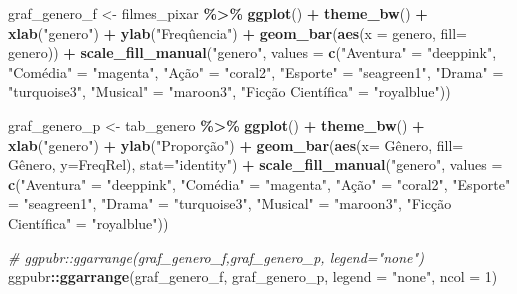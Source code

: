 \documentclass[
]{book}
\newenvironment{Shaded}{\begin{snugshade}}{\end{snugshade}}
\newcommand{\AttributeTok}[1]{\textcolor[rgb]{0.13,0.29,0.53}{#1}}
\newcommand{\CommentTok}[1]{\textcolor[rgb]{0.56,0.35,0.01}{\textit{#1}}}
\newcommand{\DecValTok}[1]{\textcolor[rgb]{0.00,0.00,0.81}{#1}}
\newcommand{\FunctionTok}[1]{\textcolor[rgb]{0.13,0.29,0.53}{\textbf{#1}}}
\newcommand{\NormalTok}[1]{#1}
\newcommand{\OtherTok}[1]{\textcolor[rgb]{0.56,0.35,0.01}{#1}}
\newcommand{\SpecialCharTok}[1]{\textcolor[rgb]{0.81,0.36,0.00}{\textbf{#1}}}
\newcommand{\StringTok}[1]{\textcolor[rgb]{0.31,0.60,0.02}{#1}}
\begin{document}
\begin{Shaded}
\begin{Highlighting}[]
\NormalTok{graf\_genero\_f }\OtherTok{\textless{}{-}}\NormalTok{ filmes\_pixar }\SpecialCharTok{\%\textgreater{}\%} 
  \FunctionTok{ggplot}\NormalTok{() }\SpecialCharTok{+} \FunctionTok{theme\_bw}\NormalTok{() }\SpecialCharTok{+} \FunctionTok{xlab}\NormalTok{(}\StringTok{"genero"}\NormalTok{) }\SpecialCharTok{+} \FunctionTok{ylab}\NormalTok{(}\StringTok{"Freqûencia"}\NormalTok{) }\SpecialCharTok{+}
  \FunctionTok{geom\_bar}\NormalTok{(}\FunctionTok{aes}\NormalTok{(}\AttributeTok{x =}\NormalTok{ genero, }\AttributeTok{fill=}\NormalTok{ genero)) }\SpecialCharTok{+} 
  \FunctionTok{scale\_fill\_manual}\NormalTok{(}\StringTok{"genero"}\NormalTok{, }\AttributeTok{values =} \FunctionTok{c}\NormalTok{(}\StringTok{"Aventura"} \OtherTok{=} \StringTok{"deeppink"}\NormalTok{, }
                   \StringTok{"Comédia"} \OtherTok{=} \StringTok{"magenta"}\NormalTok{, }\StringTok{"Ação"} \OtherTok{=} \StringTok{"coral2"}\NormalTok{, }
                   \StringTok{"Esporte"} \OtherTok{=} \StringTok{"seagreen1"}\NormalTok{, }\StringTok{"Drama"} \OtherTok{=} \StringTok{"turquoise3"}\NormalTok{, }
                   \StringTok{"Musical"} \OtherTok{=} \StringTok{"maroon3"}\NormalTok{, }\StringTok{"Ficção Científica"} \OtherTok{=} \StringTok{"royalblue"}\NormalTok{))}

\NormalTok{graf\_genero\_p }\OtherTok{\textless{}{-}}\NormalTok{ tab\_genero }\SpecialCharTok{\%\textgreater{}\%} 
  \FunctionTok{ggplot}\NormalTok{() }\SpecialCharTok{+} \FunctionTok{theme\_bw}\NormalTok{() }\SpecialCharTok{+} \FunctionTok{xlab}\NormalTok{(}\StringTok{"genero"}\NormalTok{) }\SpecialCharTok{+} \FunctionTok{ylab}\NormalTok{(}\StringTok{"Proporção"}\NormalTok{) }\SpecialCharTok{+}
  \FunctionTok{geom\_bar}\NormalTok{(}\FunctionTok{aes}\NormalTok{(}\AttributeTok{x=}\NormalTok{ Gênero, }\AttributeTok{fill=}\NormalTok{ Gênero, }\AttributeTok{y=}\NormalTok{FreqRel), }\AttributeTok{stat=}\StringTok{"identity"}\NormalTok{) }\SpecialCharTok{+} 
  \FunctionTok{scale\_fill\_manual}\NormalTok{(}\StringTok{"genero"}\NormalTok{, }\AttributeTok{values =} \FunctionTok{c}\NormalTok{(}\StringTok{"Aventura"} \OtherTok{=} \StringTok{"deeppink"}\NormalTok{, }
                    \StringTok{"Comédia"} \OtherTok{=} \StringTok{"magenta"}\NormalTok{, }\StringTok{"Ação"} \OtherTok{=} \StringTok{"coral2"}\NormalTok{, }
                    \StringTok{"Esporte"} \OtherTok{=} \StringTok{"seagreen1"}\NormalTok{, }\StringTok{"Drama"} \OtherTok{=} \StringTok{"turquoise3"}\NormalTok{, }
                    \StringTok{"Musical"} \OtherTok{=} \StringTok{"maroon3"}\NormalTok{, }\StringTok{"Ficção Científica"} \OtherTok{=} \StringTok{"royalblue"}\NormalTok{))}

\CommentTok{\# ggpubr::ggarrange(graf\_genero\_f,graf\_genero\_p, legend="none")}
\NormalTok{ggpubr}\SpecialCharTok{::}\FunctionTok{ggarrange}\NormalTok{(graf\_genero\_f, graf\_genero\_p, }\AttributeTok{legend =} \StringTok{"none"}\NormalTok{, }\AttributeTok{ncol =} \DecValTok{1}\NormalTok{)}
\end{Highlighting}
\end{Shaded}
\end{document}
